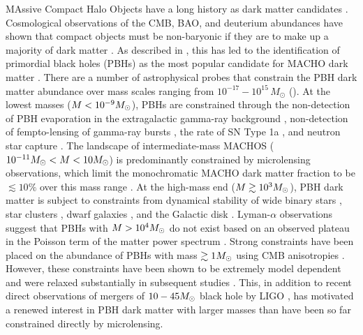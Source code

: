 MAssive Compact Halo Objects \citep[MACHOs;][]{1991ApJ...366..412G} have a long history as dark matter candidates \citep{1974ApJ...193L...1O, 1980ApJS...44...73B, 1981ApJ...243..140G, 1986ApJ...304....1P, Bellido:1996, Clesse:2015, Bird:2016, Clesse:2016}. 
Cosmological observations of the CMB, BAO, and deuterium abundances have shown that compact objects must be non-baryonic if they are to make up a majority of dark matter \citep[\eg][]{Ade:2015xua}. 
As described in , this has led to the identification of primordial black holes (PBHs) as the most popular candidate for MACHO dark matter \citep{Bellido:1996}.
There are a number of astrophysical probes that constrain the PBH dark matter abundance over mass scales ranging from $10^{-17}-10^{15}\,M_\odot$ ().
At the lowest masses ($M < 10^{-9}M_\odot$), PBHs are constrained through the non-detection of PBH evaporation in the extragalactic gamma-ray background \citep[\eg,][]{0912.5297, 1604.05349}, non-detection of fempto-lensing of gamma-ray bursts \citep[\eg,][]{1204.2056}, the rate of SN Type 1a \citep{1805.07381}, and neutron star capture \citep[\eg,][]{2013PhRvD..87l3524C}.
The landscape of intermediate-mass MACHOS ($10^{-11} M_\odot < M < 10 M_\odot$) is predominantly constrained by microlensing observations, which limit the monochromatic MACHO dark matter fraction to be $\lesssim 10\%$ over this mass range \citep[\eg][]{2001ApJ...550L.169A, 2007A&A...469..387T, 2009MNRAS.397.1228W, 1701.02151}.
At the high-mass end ($M \gtrsim 10^3M_\odot$), PBH dark matter is subject to constraints from dynamical stability of wide binary stars \citep[\eg][]{2009MNRAS.396L..11Q, 2004ApJ...601..311Y}, star clusters \citep[\eg]{2016ApJ...824L..31B, 1611.05052}, dwarf galaxies \citep{}, and the Galactic disk \citep[\eg][]{1985ApJ...299..633L, 1994ApJ...437..184X}.
Lyman-$\alpha$ observations suggest that PBHs with $M > 10^4M_\odot$ do not exist based on an observed plateau in the Poisson term of the matter power spectrum \citep{astro-ph/0302035}.
Strong constraints have been placed on the abundance of PBHs with mass $\gtrsim 1 M_\odot$ using CMB anisotropies \citep{2008ApJ...680..829R}.
However, these constraints have been shown to be extremely model dependent and were relaxed substantially in subsequent studies \citep{1612.05644}.
This, in addition to recent direct observations of mergers of $10-45 M_\odot$ black hole by LIGO \citep{1602.03837},
has motivated a renewed interest in PBH dark matter with larger masses than have been so far constrained directly by microlensing.

